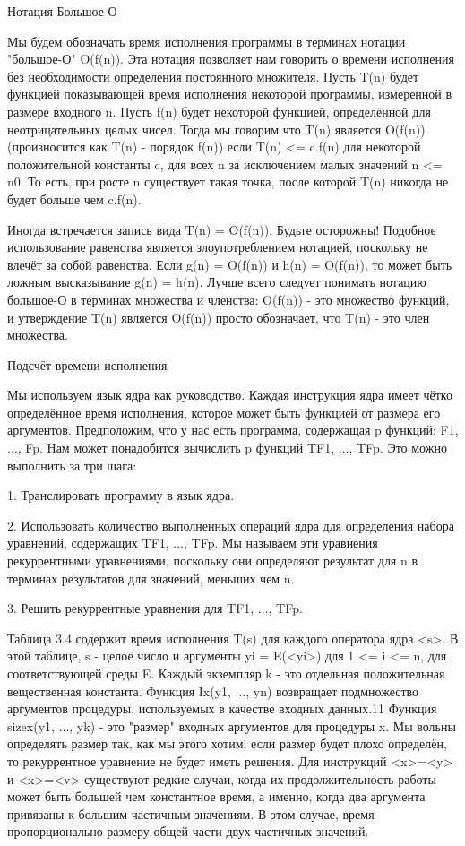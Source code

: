 Нотация Большое-О

Мы будем обозначать время исполнения программы в терминах нотации "большое-О" O(f(n)). Эта нотация позволяет нам говорить о времени исполнения без необходимости определения постоянного множителя. Пусть T(n) будет функцией показывающей время исполнения некоторой программы, измеренной в размере входного n. Пусть f(n) будет некоторой функцией, определённой для неотрицательных целых чисел. Тогда мы говорим что T(n) является O(f(n)) (произносится как T(n) - порядок f(n)) если T(n) <= c.f(n) для некоторой положительной константы c, для всех n за исключением малых значений n <= n0. То есть, при росте n существует такая точка, после которой T(n) никогда не будет больше чем c.f(n).

Иногда встречается запись вида T(n) = O(f(n)). Будьте осторожны! Подобное использование равенства является злоупотреблением нотацией, поскольку не влечёт за собой равенства. Если g(n) = O(f(n)) и h(n) = O(f(n)), то может быть ложным высказывание g(n) = h(n). Лучше всего следует понимать нотацию большое-О в терминах множества и членства: O(f(n)) - это множество функций, и утверждение T(n) является O(f(n)) просто обозначает, что T(n) - это член множества.

Подсчёт времени исполнения

Мы используем язык ядра как руководство. Каждая инструкция ядра имеет чётко определённое время исполнения, которое может быть функцией от размера его аргументов. Предположим, что у нас есть программа, содержащая p функций: F1, ..., Fp. Нам может понадобится вычислить p функций TF1, ..., TFp. Это можно выполнить за три шага:

1. Транслировать программу в язык ядра.

2. Использовать количество выполненных операций ядра для определения набора уравнений, содержащих TF1, ..., TFp. Мы называем эти уравнения рекуррентными уравнениями, поскольку они определяют результат для n в терминах результатов для значений, меньших чем n.

3. Решить рекуррентные уравнения для TF1, ..., TFp.

Таблица 3.4 содержит время исполнения T(s) для каждого оператора ядра <s>. В этой таблице, s - целое число и аргументы yi = E(<yi>) для 1 <= i <= n, для соответствующей среды E. Каждый экземпляр k - это отдельная положительная вещественная константа. Функция Ix({y1, ..., yn}) возвращает подмножество аргументов процедуры, используемых в качестве входных данных.11 Функция sizex({y1, ..., yk}) - это "размер" входных аргументов для процедуры x. Мы вольны определять размер так, как мы этого хотим; если размер будет плохо определён, то рекуррентное уравнение не будет иметь решения. Для инструкций <x>=<y> и <x>=<v> существуют редкие случаи, когда их продолжительность работы может быть большей чем константное время, а именно, когда два аргумента привязаны к большим частичным значениям. В этом случае, время пропорционально размеру общей части двух частичных значений.

